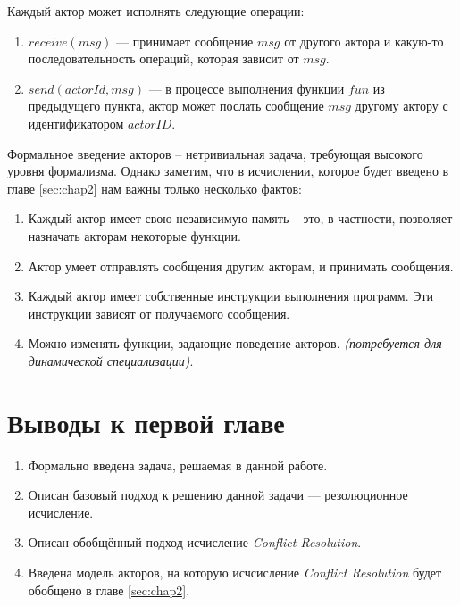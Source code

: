 Каждый актор может исполнять следующие операции:

\begin{enumerate}
  	\item $receive(msg)$ --- принимает сообщение $msg$ от другого актора и какую-то последовательность операций, которая зависит от $msg$.
    \item $send(actorId, msg)$ --- в процессе выполнения функции $fun$ из предыдущего пункта, актор может послать сообщение $msg$ другому актору с идентификатором $actorID$.
\end{enumerate}

Формальное введение акторов -- нетривиальная задача, требующая высокого уровня формализма. Однако заметим, что в исчислении, которое будет введено в главе \ref{sec:chap2} нам важны только несколько фактов:
\begin{enumerate}
	\item Каждый актор имеет свою независимую память -- это, в частности, позволяет назначать акторам некоторые функции.
    \item Актор умеет отправлять сообщения другим акторам, и принимать сообщения.
    \item Каждый актор имеет собственные инструкции выполнения программ. Эти инструкции зависят от получаемого сообщения.
    \item Можно изменять функции, задающие поведение акторов. \emph{(потребуется для динамической специализации)}.
\end{enumerate}

\section{Выводы к первой главе}
\begin{enumerate}
	\item Формально введена задача, решаемая в данной работе.
    \item Описан базовый подход к решению данной задачи --- резолюционное исчисление.
    \item Описан обобщённый подход исчисление \emph{Conflict Resolution}.
    \item Введена модель акторов, на которую исчсисление \emph{Conflict Resolution} будет обобщено в главе \ref{sec:chap2}.
\end{enumerate}

